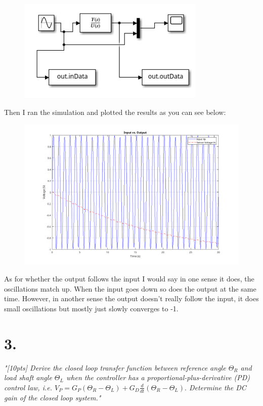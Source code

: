 \documentclass{article}
\begin{document}
\begin{figure}[H]
    \centering
    \includegraphics[width=0.8\textwidth]{simulinkOpenModel.png}
\end{figure}

Then I ran the simulation and plotted the results as you can see below:

\begin{figure}[H]
    \centering
    \includegraphics[width=\textwidth]{openPlot.png}
\end{figure}

As for whether the output follows the input I would say in one sense it does, the oscillations match up.
When the input goes down so does the output at the same time.
However, in another sense the output doesn't really follow the input, it does small oscillations but mostly just slowly converges to -1.

\section*{3.}

\textit{
    "[10pts] Derive the closed loop transfer function between reference angle
    $\Theta_R$ and load shaft angle $\Theta_L$ when the controller has a 
    proportional-plus-derivative (PD) control law, i.e.
    $V_P = G_P(\Theta_R - \Theta_L) + G_D\frac{d}{dt}(\Theta_R - \Theta_L).$
    Determine the DC gain of the closed loop system."
}
\end{document}
